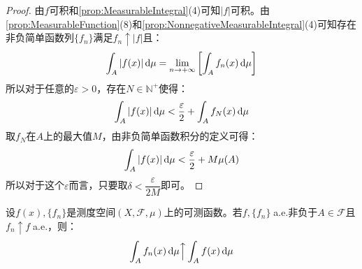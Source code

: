 \begin{proof}
	由$f$可积和\cref{prop:MeasurableIntegral}(4)可知$|f|$可积。由\cref{prop:MeasurableFunction}(8)和\cref{prop:NonnegativeMeasurableIntegral}(4)可知存在非负简单函数列$\{f_n\}$满足$f_n\uparrow |f|$且：
	\begin{equation*}
		\int_{A}|f(x)|\mathop{}\!\mathrm{d}\mu=\lim_{n\to+\infty}\left[\int_{A}f_n(x)\mathop{}\!\mathrm{d}\mu\right]
	\end{equation*}
	所以对于任意的$\varepsilon>0$，存在$N\in\mathbb{N}^+$使得：
	\begin{equation*}
		\int_{A}|f(x)|\mathop{}\!\mathrm{d}\mu<\frac{\varepsilon}{2}+\int_{A}f_N(x)\mathop{}\!\mathrm{d}\mu
	\end{equation*}
	取$f_N$在$A$上的最大值$M$，由非负简单函数积分的定义可得：
	\begin{equation*}
		\int_{A}|f(x)|\mathop{}\!\mathrm{d}\mu<\frac{\varepsilon}{2}+M\mu(A)
	\end{equation*}
	所以对于这个$\varepsilon$而言，只要取$\delta<\dfrac{\varepsilon}{2M}$即可。
\end{proof}
\begin{theorem}\label{theo:LeviTheorem}
	设$f(x),\{f_n\}$是测度空间$(X,\mathscr{F},\mu)$上的可测函数。若$f,\{f_n\}\;$a.e.非负于$A\in\mathscr{F}$且$f_n\uparrow f\;$a.e.，则：
	\begin{equation*}
		\int_{A}f_n(x)\mathop{}\!\mathrm{d}\mu\Big\uparrow\int_{A}f(x)\mathop{}\!\mathrm{d}\mu
	\end{equation*}
\end{theorem}
